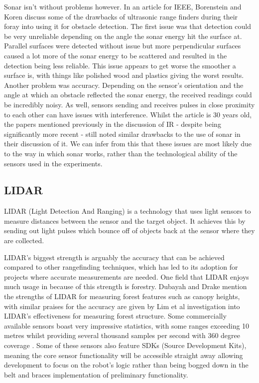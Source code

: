 				Sonar isn't without problems however. In an article for IEEE, Borenstein and Koren\citep{borenstein1988obstacle} discuss some of the drawbacks of ultrasonic range finders during their foray into using it for obstacle detection. The first issue was that detection could be very unreliable depending on the angle the sonar energy hit the surface at. Parallel surfaces were detected without issue but more perpendicular surfaces caused a lot more of the sonar energy to be scattered and resulted in the detection being less reliable. This issue appears to get worse the smoother a surface is, with things like polished wood and plastics giving the worst results. Another problem was accuracy. Depending on the sensor's orientation and the angle at which an obstacle reflected the sonar energy, the received readings could be incredibly noisy. As well, sensors sending and receives pulses in close proximity to each other can have issues with interference. Whilst the article is 30 years old, the papers mentioned previously in the discussion of IR - despite being significantly more recent - still noted similar drawbacks to the use of sonar in their discussion of it\citep{do2013infrared}\cite{lee2011low}. We can infer from this that these issues are most likely due to the way in which sonar works, rather than the technological ability of the sensors used in the experiments.
				
				\subsection{LIDAR}
				\label{litreview:lidar}
				LIDAR (Light Detection And Ranging) is a technology that uses light sensors to measure distances between the sensor and the target object. It achieves this by sending out light pulses which bounce off of objects back at the sensor where they are collected.
				
				LIDAR's biggest strength is arguably the accuracy that can be achieved compared to other rangefinding techniques, which has led to its adoption for projects where accurate measurements are needed. One field that LIDAR enjoys much usage in because of this strength is forestry. Dubayah and Drake\citep{dubayah2000lidar} mention the strengths of LIDAR for measuring forest features such as canopy heights, with similar praises for the accuracy are given by Lim et al\citep{lim2003lidar} investigation into LIDAR's effectiveness for measuring forest structure. Some commercially available sensors boast very impressive statistics, with some ranges exceeding 10 metres whilst providing several thousand samples per second with 360 degree coverage \citep{slamtecA1M8}. Some of these sensors also feature SDKs (Source Development Kits), meaning the core sensor functionality will be accessible straight away allowing development to focus on the robot's logic rather than being bogged down in the belt and braces implementation of preliminary functionality. 
				
